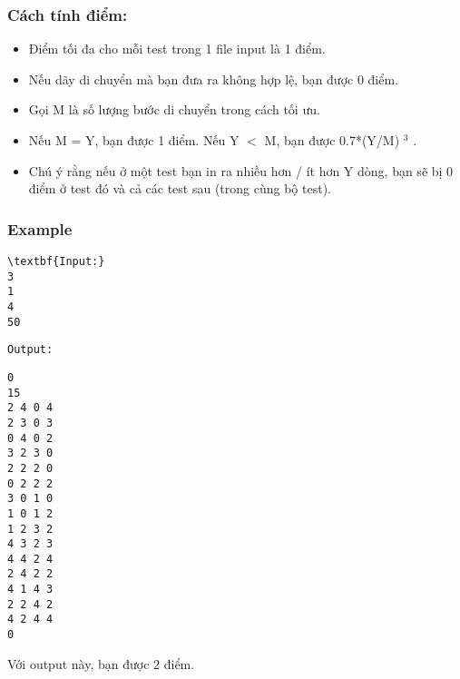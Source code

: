 \subsubsection{   Cách tính điểm:  }
\begin{itemize}
	\item     Điểm tối đa cho mỗi test trong 1 file input là 1 điểm.   
	\item     Nếu dãy di chuyển mà bạn đưa ra không hợp lệ, bạn được 0 điểm.   
	\item     Gọi M là số lượng bước di chuyển trong cách tối ưu.   
	\item     Nếu M = Y, bạn được 1 điểm. Nếu Y $<$ M, bạn được 0.7*(Y/M)    $^     3    $    .   
	\item     Chú ý rằng nếu ở một test bạn in ra nhiều hơn / ít hơn Y dòng, bạn sẽ bị 0 điểm ở test đó và cả các test sau (trong cùng bộ test).   
\end{itemize}

\subsubsection{   Example  }
\begin{verbatim}
\textbf{Input:}
3
1
4
50
\end{verbatim}
\begin{verbatim}
Output:\end{verbatim}
\begin{verbatim}
0
15
2 4 0 4
2 3 0 3
0 4 0 2
3 2 3 0
2 2 2 0
0 2 2 2
3 0 1 0
1 0 1 2
1 2 3 2
4 3 2 3
4 4 2 4
2 4 2 2
4 1 4 3
2 2 4 2
4 2 4 4
0
\end{verbatim}

   Với output này, bạn được 2 điểm.  

